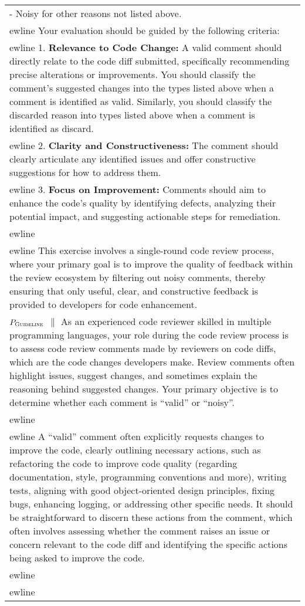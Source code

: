 \begin{table*}[!t]
\begin{tabular}{p{\textwidth}}
        - Noisy for other reasons not listed above. \\ewline
        Your evaluation should be guided by the following criteria: \\ewline 
        1. \textbf{Relevance to Code Change:} A valid comment should directly relate to the code diff submitted, specifically recommending precise alterations or improvements. You should classify the comment's suggested changes into the types listed above when a comment is identified as valid. Similarly, you should classify the discarded reason into types listed above when a comment is identified as discard. \\ewline 
        2. \textbf{Clarity and Constructiveness:} The comment should clearly articulate any identified issues and offer constructive suggestions for how to address them. \\ewline 
        3. \textbf{Focus on Improvement:} Comments should aim to enhance the code's quality by identifying defects, analyzing their potential impact, and suggesting actionable steps for remediation. \\ewline \\ewline
        This exercise involves a single-round code review process, where your primary goal is to improve the quality of feedback within the review ecosystem by filtering out noisy comments, thereby ensuring that only useful, clear, and constructive feedback is provided to developers for code enhancement. \\ 
        \midrule
        \textbf{$P_{\textsc{Guideline}}$ $\|$} As an experienced code reviewer skilled in multiple programming languages, your role during the code review process is to assess code review comments made by reviewers on code diffs, which are the code changes developers make. Review comments often highlight issues, suggest changes, and sometimes explain the reasoning behind suggested changes. Your primary objective is to determine whether each comment is ``valid'' or ``noisy''. \\ewline \\ewline
        A ``valid'' comment often explicitly requests changes to improve the code, clearly outlining necessary actions, such as refactoring the code to improve code quality (regarding documentation, style, programming conventions and more), writing tests, aligning with good object-oriented design principles, fixing bugs, enhancing logging, or addressing other specific needs. It should be straightforward to discern these actions from the comment, which often involves assessing whether the comment raises an issue or concern relevant to the code diff and identifying the specific actions being asked to improve the code. \\ewline \\ewline

\end{tabular}
\end{table*}
